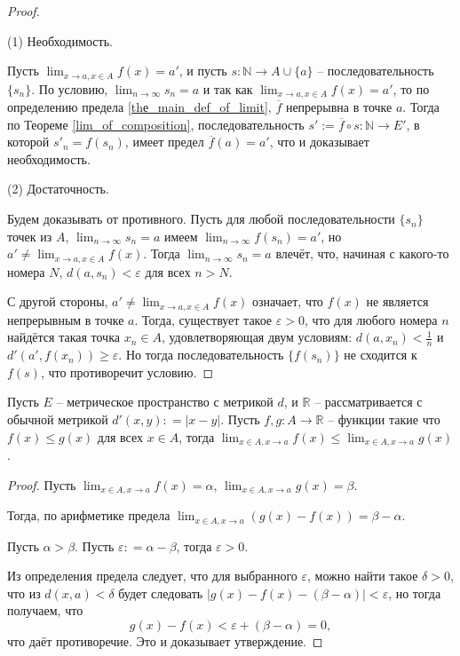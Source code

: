 \begin{proof}~

(1) Необходимость. 

Пусть $\lim_{x \to a, x \in A}f(x) = a'$, и пусть $s:\mathbb{N} \to {A}\cup \{a\}$ -- последовательность $\{s_n\}$. По условию, $\lim_{n \to \infty }s_n = a$ и так как $\lim_{x \to a, x \in A}f(x) = a'$, то по определению предела \ref{thе_main_def_of_limit}, $\overline{f}$ непрерывна в точке $a$. Тогда по Теореме \ref{lim_of_composition}, последовательность $s':=\overline{f} \circ s: \mathbb{N} \to E'$, в которой $s'_n = f(s_n)$, имеет предел $\overline{f}(a) = a'$, что и доказывает необходимость.

(2) Достаточность.

Будем доказывать от противного. Пусть для любой последовательности $\{s_n\}$ точек из $A$, $\lim_{n \to \infty} s_n = a$ имеем $\lim_{n \to \infty}f(s_n) = a'$, но $a' \ne \lim_{x \to a, x\in A}f(x).$ Тогда  $\lim_{n \to \infty} s_n = a$ влечёт, что, начиная с какого-то номера $N$, $d(a,s_n) < \varepsilon$ для всех $n > N$.

С другой стороны, $a' \ne \lim_{x \to a, x\in A}f(x)$ означает, что $f(x)$ не является непрерывным в точке $a$. Тогда, существует такое $\varepsilon >0$, что для любого номера $n$ найдётся такая точка $x_n \in A$, удовлетворяющая двум условиям: $d(a,x_n) < \frac{1}{n}$ и $d'(a',f(x_n))\ge \varepsilon$. Но тогда последовательность $\{f(s_n)\}$ не сходится к $f(s)$, что противоречит условию.
\end{proof}


\begin{theorem}\label{f<g=>lim}
  Пусть $E$ -- метрическое пространство с метрикой $d$, и $\mathbb{R}$ -- рассматривается с обычной метрикой $d'(x,y): = |x-y|$.  Пусть $f,g:A \to \mathbb{R}$ -- функции такие что $f(x) \le g(x)$ для всех $x \in A$, тогда $\lim_{x\in A, x \to a}f(x) \le \lim_{x \in A, x \to a}g(x)$.
\end{theorem}

\begin{proof}
Пусть $\lim_{x\in A, x \to a}f(x) = \alpha$, $\lim_{x\in A, x \to a}g(x) = \beta$.

Тогда, по арифметике предела $\lim_{x\in A, x \to a}(g(x) - f(x)) = \beta - \alpha.$

Пусть $\alpha > \beta$. Пусть $\varepsilon : = \alpha - \beta$, тогда $\varepsilon >0$.

Из определения предела следует, что для выбранного $\varepsilon$, можно найти такое $\delta>0$, что из $d(x,a)<\delta$ будет следовать $|g(x) - f(x) - (\beta - \alpha)| < \varepsilon$, но тогда получаем, что
\[
 g(x) - f(x) < \varepsilon + (\beta - \alpha) = 0,
\]
что даёт противоречие. Это и доказывает утверждение.
\end{proof}







